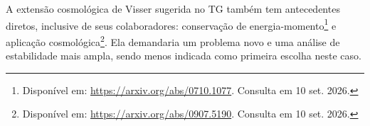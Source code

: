 A extensão cosmológica de Visser sugerida no TG também tem antecedentes
diretos, inclusive de seus colaboradores: conservação de
energia-momento\footnote{Disponível em:
  \url{https://arxiv.org/abs/0710.1077}. Consulta em 10 set. 2026.} e
aplicação cosmológica\footnote{Disponível em:
  \url{https://arxiv.org/abs/0907.5190}. Consulta em 10 set. 2026.}. Ela
demandaria um problema novo e uma análise de estabilidade mais ampla,
sendo menos indicada como primeira escolha neste caso.
